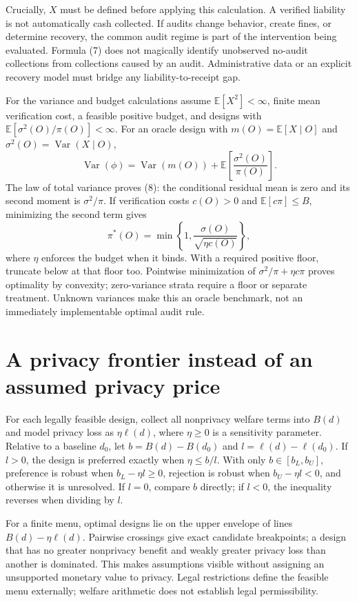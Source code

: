 \documentclass[11pt]{article}
\newcommand{\E}{\mathbb E}
\newcommand{\Var}{\operatorname{Var}}
\begin{document}
Crucially, $X$ must be defined before applying this calculation. A verified liability is not automatically cash collected. If audits change behavior, create fines, or determine recovery, the common audit regime is part of the intervention being evaluated. Formula (7) does not magically identify unobserved no-audit collections from collections caused by an audit. Administrative data or an explicit recovery model must bridge any liability-to-receipt gap.

For the variance and budget calculations assume $\E[X^2]<\infty$, finite mean verification cost, a feasible positive budget, and designs with $\E[\sigma^2(O)/\pi(O)]<\infty$. For an oracle design with $m(O)=\E[X\mid O]$ and $\sigma^2(O)=\Var(X\mid O)$,
\[
 \Var(\phi)=\Var(m(O))+\E\left[\frac{\sigma^2(O)}{\pi(O)}\right]. \tag{8}
\]
The law of total variance proves (8): the conditional residual mean is zero and its second moment is $\sigma^2/\pi$. If verification costs $c(O)>0$ and $\E[c\pi]\leq B$, minimizing the second term gives
\[
 \pi^*(O)=\min\left\{1,\frac{\sigma(O)}{\sqrt{\eta c(O)}}\right\}, \tag{9}
\]
where $\eta$ enforces the budget when it binds. With a required positive floor, truncate below at that floor too. Pointwise minimization of $\sigma^2/\pi+\eta c\pi$ proves optimality by convexity; zero-variance strata require a floor or separate treatment. Unknown variances make this an oracle benchmark, not an immediately implementable optimal audit rule.

\section*{A privacy frontier instead of an assumed privacy price}
For each legally feasible design, collect all nonprivacy welfare terms into $B(d)$ and model privacy loss as $\eta\ell(d)$, where $\eta\geq0$ is a sensitivity parameter. Relative to a baseline $d_0$, let $b=B(d)-B(d_0)$ and $l=\ell(d)-\ell(d_0)$. If $l>0$, the design is preferred exactly when $\eta\leq b/l$. With only $b\in[b_L,b_U]$, preference is robust when $b_L-\eta l\geq0$, rejection is robust when $b_U-\eta l<0$, and otherwise it is unresolved. If $l=0$, compare $b$ directly; if $l<0$, the inequality reverses when dividing by $l$.

For a finite menu, optimal designs lie on the upper envelope of lines $B(d)-\eta\ell(d)$. Pairwise crossings give exact candidate breakpoints; a design that has no greater nonprivacy benefit and weakly greater privacy loss than another is dominated. This makes assumptions visible without assigning an unsupported monetary value to privacy. Legal restrictions define the feasible menu externally; welfare arithmetic does not establish legal permissibility.
\end{document}
